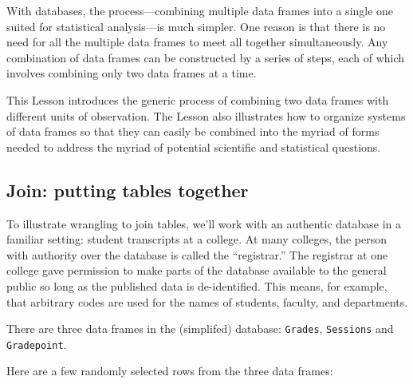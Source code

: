 \documentclass[
  letterpaper,
  DIV=11,
  numbers=noendperiod,
  oneside]{scrartcl}
\begin{document}
With databases, the process---combining multiple data frames into a
single one suited for statistical analysis---is much simpler. One reason
is that there is no need for all the multiple data frames to meet all
together simultaneously. {} Any combination
of data frames can be constructed by a series of steps, each of which
involves combining only two data frames at a time.

This Lesson introduces the generic process of combining two data frames
with different units of observation. The Lesson also illustrates how to
organize systems of data frames so that they can easily be combined into
the myriad of forms needed to address the myriad of potential scientific
and statistical questions.

\subsection{Join: putting tables together}\label{sec-grade-joins}

To illustrate wrangling to join tables, we'll work with an authentic
database in a familiar setting: student transcripts at a college. At
many colleges, the person with authority over the database is called the
``registrar.'' The registrar at one college gave permission to make
parts of the database available to the general public so long as the
published data is de-identified. This means, for example, that arbitrary
codes are used for the names of students, faculty, and departments.

There are three data frames in the (simplifed) database:
\texttt{Grades}, \texttt{Sessions} and \texttt{Gradepoint}.

Here are a few randomly selected rows from the three data frames:
\end{document}

